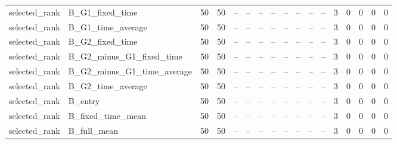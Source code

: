 \begin{longtable}{lllllllllllllllll}
selected\_rank & B\_G1\_fixed\_time & 50 & 50 & -- & -- & -- & -- & -- & -- & -- & -- & 3 & 0 & 0 & 0 & 0 \\
selected\_rank & B\_G1\_time\_average & 50 & 50 & -- & -- & -- & -- & -- & -- & -- & -- & 3 & 0 & 0 & 0 & 0 \\
selected\_rank & B\_G2\_fixed\_time & 50 & 50 & -- & -- & -- & -- & -- & -- & -- & -- & 3 & 0 & 0 & 0 & 0 \\
selected\_rank & B\_G2\_minus\_G1\_fixed\_time & 50 & 50 & -- & -- & -- & -- & -- & -- & -- & -- & 3 & 0 & 0 & 0 & 0 \\
selected\_rank & B\_G2\_minus\_G1\_time\_average & 50 & 50 & -- & -- & -- & -- & -- & -- & -- & -- & 3 & 0 & 0 & 0 & 0 \\
selected\_rank & B\_G2\_time\_average & 50 & 50 & -- & -- & -- & -- & -- & -- & -- & -- & 3 & 0 & 0 & 0 & 0 \\
selected\_rank & B\_entry & 50 & 50 & -- & -- & -- & -- & -- & -- & -- & -- & 3 & 0 & 0 & 0 & 0 \\
selected\_rank & B\_fixed\_time\_mean & 50 & 50 & -- & -- & -- & -- & -- & -- & -- & -- & 3 & 0 & 0 & 0 & 0 \\
selected\_rank & B\_full\_mean & 50 & 50 & -- & -- & -- & -- & -- & -- & -- & -- & 3 & 0 & 0 & 0 & 0 \\
\bottomrule
\end{longtable}
\endgroup
